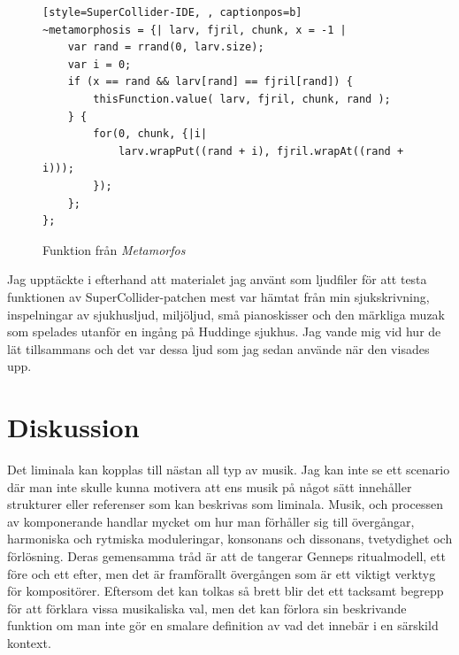 \documentclass{article}
\renewcommand{\baselinestretch}{1.5}
\begin{document}
\begin{figure}[hb]
\renewcommand{\baselinestretch}{1}
\begin{lstlisting}[style=SuperCollider-IDE, , captionpos=b]
~metamorphosis = {| larv, fjril, chunk, x = -1 |
	var rand = rrand(0, larv.size);
	var i = 0;
	if (x == rand && larv[rand] == fjril[rand]) {
		thisFunction.value( larv, fjril, chunk, rand );
	} {
		for(0, chunk, {|i|
			larv.wrapPut((rand + i), fjril.wrapAt((rand + i)));
		});
	};
};
\end{lstlisting}
\caption{Funktion från \emph{Metamorfos}}
\end{figure}
\renewcommand{\baselinestretch}{1.5}
\pagebreak

Jag upptäckte i efterhand att materialet jag använt som ljudfiler för att testa funktionen av
SuperCollider-patchen mest var hämtat från min sjukskrivning, inspelningar av sjukhusljud, miljöljud, små
pianoskisser och den märkliga muzak som spelades utanför en ingång på Huddinge sjukhus. Jag vande mig vid hur
de lät tillsammans och det var dessa ljud som jag sedan använde när den visades upp. 
%



\pagebreak
\section{Diskussion}
Det liminala kan kopplas till nästan all typ av musik. Jag kan inte se ett scenario där man inte skulle kunna
motivera att ens musik på något sätt innehåller strukturer eller referenser som kan beskrivas som liminala.
Musik, och processen av komponerande handlar mycket om hur man förhåller sig till övergångar, harmoniska och
rytmiska moduleringar, konsonans och dissonans, tvetydighet och förlösning. Deras gemensamma tråd är att de
tangerar Genneps ritualmodell, ett före och ett efter, men det är framförallt övergången som är ett viktigt
verktyg för kompositörer. Eftersom det kan tolkas så brett blir det ett tacksamt begrepp för att förklara
vissa musikaliska val, men det kan förlora sin beskrivande funktion om man inte gör en smalare definition av
vad det innebär i en särskild kontext.
\end{document}
